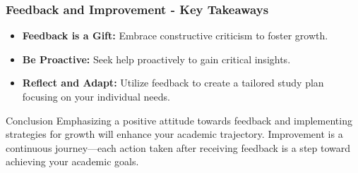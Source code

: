 \documentclass[aspectratio=169]{beamer}
\begin{document}
\begin{frame}[fragile]
    \frametitle{Feedback and Improvement - Key Takeaways}
    \begin{itemize}
        \item \textbf{Feedback is a Gift:} Embrace constructive criticism to foster growth.
        \item \textbf{Be Proactive:} Seek help proactively to gain critical insights.
        \item \textbf{Reflect and Adapt:} Utilize feedback to create a tailored study plan focusing on your individual needs.
    \end{itemize}

    \begin{block}{Conclusion}
        Emphasizing a positive attitude towards feedback and implementing strategies for growth will enhance your academic trajectory. Improvement is a continuous journey—each action taken after receiving feedback is a step toward achieving your academic goals.
    \end{block}
\end{frame}
\end{document}
